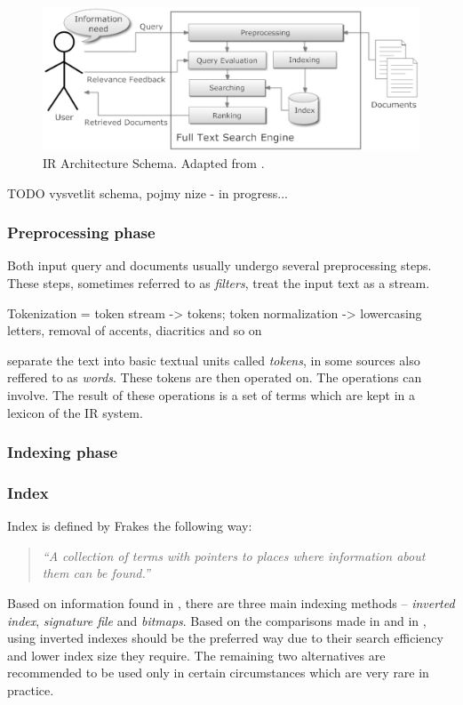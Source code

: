 \begin{figure}[h]
	\centering
		\includegraphics[scale=0.63]{figures/fulltext_schema.eps}
	\caption{IR Architecture Schema. Adapted from \cite{IR:ImplemEvalSearchEng}.}
	\label{fig:fulltext_schema}
\end{figure}

TODO vysvetlit schema, pojmy nize - in progress...

\subsubsection{Preprocessing phase}

Both input query and documents usually undergo several preprocessing steps. These steps, sometimes referred to as \textsl{filters},   
treat the input text as a stream. 

Tokenization = token stream -> tokens; token normalization -> lowercasing letters, removal of accents, diacritics and so on

separate the text into basic textual units called \textsl{tokens}, in some sources also reffered to as \textsl{words}. These tokens are then operated on. The operations can involve. 
The result of these operations is a set of terms which are kept in a lexicon of the IR system. 

\subsubsection{Indexing phase}

\subsubsection*{Index}

Index is defined by Frakes \cite{IRDataAlgorithms} the following way: 
	\begin{quote}
	\textsl{``A collection of terms with pointers to places where information about them can be found.''} 	
	\end{quote}
Based on information found in \cite{ManningRaghavanSchuetze08, IRDataAlgorithms, Witten:1999:MGC:323905}, there are three main indexing methods – \textit{inverted index}, \textit{signature file} and \textit{bitmaps}. Based on the comparisons made in \cite{Witten:1999:MGC:323905} and in \cite{Zobel:1996:GPC:234889.234891}, using inverted indexes should be the preferred way due to their search efficiency and lower index size they require. The remaining two alternatives are recommended to be used only in certain circumstances which are very rare in practice. 

